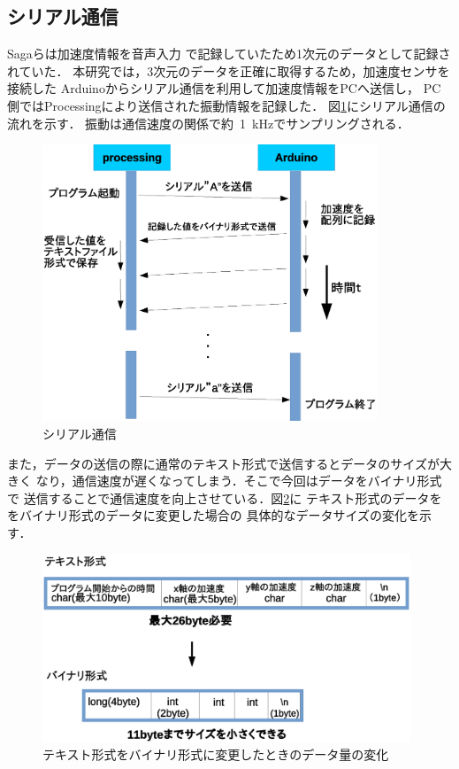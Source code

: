 \subsection{シリアル通信}
Sagaら\cite{saga2013simultaneous}は加速度情報を音声入力
で記録していたため1次元のデータとして記録されていた．
本研究では，3次元のデータを正確に取得するため，加速度センサを接続した
Arduinoからシリアル通信を利用して加速度情報をPCへ送信し，
PC側ではProcessingにより送信された振動情報を記録した．
図\ref{4-2}にシリアル通信の流れを示す．
振動は通信速度の関係で約\ 1\ kHzでサンプリングされる．

\begin{figure}[h]
\begin{center}
  \includegraphics[width=10cm]{bainari.eps}
  \caption{シリアル通信}
  \label{4-2}
\end{center}
\end{figure}
また，データの送信の際に通常のテキスト形式で送信するとデータのサイズが大きく
なり，通信速度が遅くなってしまう．そこで今回はデータをバイナリ形式で
送信することで通信速度を向上させている．図\ref{4-4}に
テキスト形式のデータををバイナリ形式のデータに変更した場合の
具体的なデータサイズの変化を示す．
\begin{figure}[h]
\begin{center}
  \includegraphics[width=11cm]{binary.eps}
  \caption{テキスト形式をバイナリ形式に変更したときのデータ量の変化}
  \label{4-4}
\end{center}
\end{figure}

